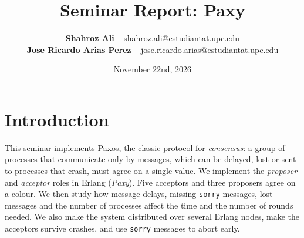 \documentclass[a4paper, 10pt]{article}
\title{Seminar Report: Paxy}
\author{
  \textbf{Shahroz Ali} -- shahroz.ali@estudiantat.upc.edu \\
  \textbf{Jose Ricardo Arias Perez} -- jose.ricardo.arias@estudiantat.upc.edu \\[4pt]
}
\date{\normalsize November 22nd, 2026}
\begin{document}
\maketitle

\section{Introduction}

This seminar implements Paxos, the classic protocol for \emph{consensus}: a group of processes that communicate only by messages, which can be delayed, lost or sent to processes that crash, must agree on a single value. We implement the \emph{proposer} and \emph{acceptor} roles in Erlang (\emph{Paxy}). Five acceptors and three proposers agree on a colour. We then study how message delays, missing \texttt{sorry} messages, lost messages and the number of processes affect the time and the number of rounds needed. We also make the system distributed over several Erlang nodes, make the acceptors survive crashes, and use \texttt{sorry} messages to abort early.

\end{document}
